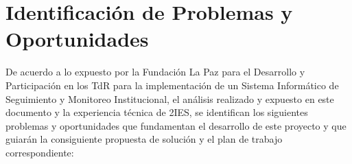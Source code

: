 \section{Identificación de Problemas y Oportunidades}


De acuerdo a lo expuesto por la Fundación La Paz para el Desarrollo y Participación en los TdR para la implementación de un Sistema Informático de Seguimiento y Monitoreo Institucional, el análisis realizado y expuesto en este documento y la experiencia técnica de 2IES, se identifican los siguientes problemas y oportunidades que fundamentan el desarrollo de este proyecto y que guiarán la consiguiente propuesta de solución y el plan de trabajo correspondiente:

